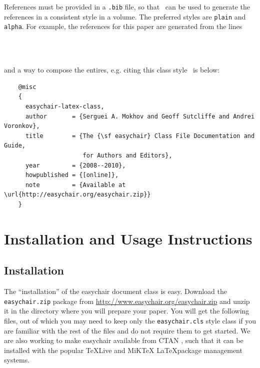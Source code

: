 \documentclass[]{easychair}
\newcommand{\easychair}{\textsf{easychair}}
\newcommand{\miktex}{MiK{\TeX}}
\begin{document}
References must be provided in a {\tt .bib} file, so that \BibTeX\ can
be used to generate the references in a consistent style in a volume.
The preferred styles are {\tt plain} and {\tt alpha}.
For example, the references for this paper are generated from the
lines
\begin{verbatim}
    
    
\end{verbatim}
and a way to compose the entires, e.g. citing this class style~\cite{easychair-latex-class}
is below:
\tiny
\begin{verbatim}
    @misc
    {
      easychair-latex-class,
      author       = {Serguei A. Mokhov and Geoff Sutcliffe and Andrei Voronkov},
      title        = {The {\sf easychair} Class File Documentation and Guide,
                      for Authors and Editors},
      year         = {2008--2010},
      howpublished = {[online]},
      note         = {Available at \url{http://easychair.org/easychair.zip}}
    }
\end{verbatim}
\normalsize

\section{Installation and Usage Instructions}
\label{sect:installation-usage}

\subsection{Installation}

The ``installation'' of the {\easychair} document class is easy.
Download the \texttt{easychair.zip} package 
from \url{http://www.easychair.org/easychair.zip}
and unzip it in the directory where you will prepare your paper.
You will get the following files, out of which you may need to keep only 
the \texttt{easychair.cls} style class if you are familiar with the rest 
of the files and do not require them to get started.
We are also working to make {\easychair} available from CTAN \cite{ctan},
such that it can be installed with the popular \TeX Live \cite{texlive} and
{\miktex} \cite{miktex} \LaTeX package management systems.
\end{document}
